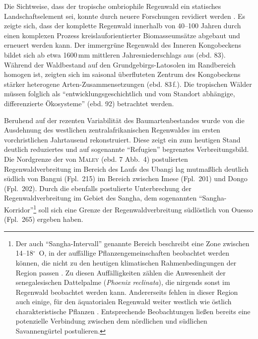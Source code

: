 \begin{multicols}{2}
Die Sichtweise, dass der tropische ombriophile Regenwald ein statisches Landschaftselement sei, konnte durch neuere Forschungen revidiert werden \parencite[83]{Runge.2001}. Es zeigte sich, dass der komplette Regenwald innerhalb von 40--100 Jahren durch einen komplexen Prozess kreislauforientierter Biomasseumsätze abgebaut und erneuert werden kann. Der immergrüne Regenwald des Inneren Kongobeckens bildet sich ab etwa 1600\,mm mittleren Jahresniederschlags aus (ebd. 83). Während der Waldbestand auf den Grundgebirgs-Latosolen im Randbereich homogen ist, zeigten sich im saisonal überfluteten Zentrum des Kongobeckens stärker heterogene Arten-Zusammensetzungen (ebd. 83\,f.). Die tropischen Wälder müssen folglich als \enquote{entwicklungsgeschichtlich und vom Standort abhängige, differenzierte Ökosysteme} (ebd. 92) betrachtet werden.

Beruhend auf der rezenten Variabilität des Baumartenbestandes wurde von \textcite{Maley.2001} die Ausdehnung des westlichen zentralafrikanischen Regenwaldes im ersten vorchristlichen Jahrtausend rekonstruiert. Diese zeigt ein zum heutigen Stand deutlich reduziertes und auf sogenannte \enquote{Refugien} begrenztes Verbreitungsbild. Die Nordgrenze der von \textsc{Maley} (ebd. 7 Abb.~4) postulierten Regenwaldverbreitung im Bereich des Laufs des \mbox{Ubangi} lag mutmaßlich deutlich südlich von Bangui (Fpl.~215) im Bereich zwischen Imese (Fpl.~201) und Dongo (Fpl.~202). Durch die ebenfalls postulierte Unterbrechung der Regenwaldverbreitung im Gebiet des \mbox{Sangha}, dem sogenannten \enquote{\mbox{Sangha}-Korridor}\footnote{Der auch \enquote{\mbox{Sangha}-Intervall} genannte Bereich beschreibt eine Zone zwischen 14--18$^\circ$~O, in der auffällige Pflanzengemeinschaften beobachtet werden können, die nicht zu den heutigen klimatischen Rahmenbedingungen der Region passen \parencite{Gond.2013}. Zu diesen Auffälligkeiten zählen die Anwesenheit der senegalesischen Dattelpalme (\textit{Phoenix reclinata}), die nirgends sonst im Regenwald beobachtet werden kann. Andererseits fehlen in dieser Region auch einige, für den äquatorialen Regenwald weiter westlich wie östlich charakteristische Pflanzen \parencite[356\,f.]{Bostoen.2015}. Entsprechende Beobachtungen ließen bereits \textcite{Letouzey.1968} eine potenzielle Verbindung zwischen dem nördlichen und südlichen Savannengürtel postulieren.\label{ftn:SanghaIntervall}} \parencites[siehe][]{Russell.2014}{Bostoen.2015} soll sich eine Grenze der Regenwaldverbreitung südlöstlich von Ouesso (Fpl.~265) ergeben haben.


\end{multicols}
